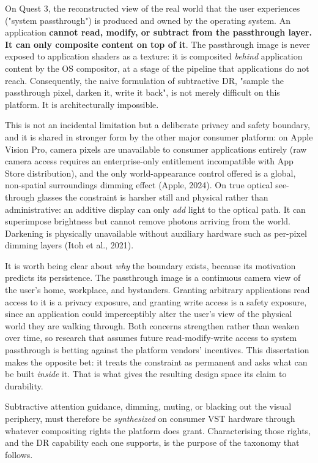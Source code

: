 On Quest 3, the reconstructed view of the real world that the user experiences ("system passthrough")
is produced and owned by the operating system. An application \textbf{cannot read, modify, or subtract from
the passthrough layer. It can only composite content on top of it}. The passthrough image is never
exposed to application shaders as a texture: it is composited \textit{behind} application content by the OS
compositor, at a stage of the pipeline that applications do not reach. Consequently, the naive
formulation of subtractive DR, "sample the passthrough pixel, darken it, write it back", is not
merely difficult on this platform. It is architecturally impossible.

This is not an incidental limitation but a deliberate privacy and safety boundary, and it is shared
in stronger form by the other major consumer platform: on Apple Vision Pro, camera pixels are
unavailable to consumer applications entirely (raw camera access requires an enterprise-only
entitlement incompatible with App Store distribution), and the only world-appearance control offered
is a global, non-spatial surroundings dimming effect (Apple, 2024). On true optical see-through
glasses the constraint is harsher still and physical rather than administrative: an additive display
can only \textit{add} light to the optical path. It can superimpose brightness but cannot remove photons
arriving from the world. Darkening is physically unavailable without auxiliary hardware such as
per-pixel dimming layers (Itoh et al., 2021).

It is worth being clear about \textit{why} the boundary exists, because its motivation predicts its
persistence. The passthrough image is a continuous camera view of the user's home, workplace, and
bystanders. Granting arbitrary applications read access to it is a privacy exposure, and granting
write access is a safety exposure, since an application could imperceptibly alter the user's view of
the physical world they are walking through. Both concerns strengthen rather than weaken over time,
so research that assumes future read-modify-write access to system passthrough is betting against the
platform vendors' incentives. This dissertation makes the opposite bet: it treats the constraint as
permanent and asks what can be built \textit{inside} it. That is what gives the resulting design space
its claim to durability.

Subtractive attention guidance, dimming, muting, or blacking out the visual periphery, must
therefore be \textit{synthesized} on consumer VST hardware through whatever compositing rights the platform
does grant. Characterising those rights, and the DR capability each one supports, is the purpose of
the taxonomy that follows.

